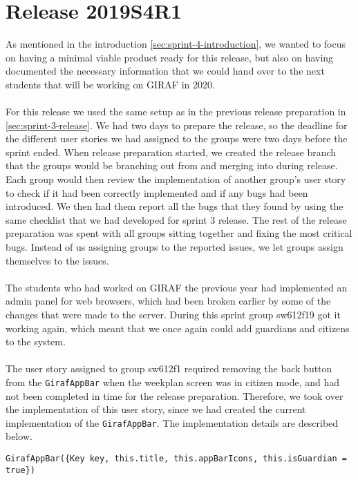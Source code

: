 \section{Release 2019S4R1}
As mentioned in the introduction \autoref{sec:sprint-4-introduction}, we wanted to focus on having a minimal viable product ready for this release, but also on having documented the necessary information that we could hand over to the next students that will be working on GIRAF in 2020.
\\\\
For this release we used the same setup as in the previous release preparation in \autoref{sec:sprint-3-release}. 
We had two days to prepare the release, so the deadline for the different user stories we had assigned to the groups were two days before the sprint ended.
When release preparation started, we created the release branch that the groups would be branching out from and merging into during release.
Each group would then review the implementation of another group's user story to check if it had been correctly implemented and if any bugs had been introduced.
We then had them report all the bugs that they found by using the same checklist that we had developed for sprint 3 release.
The rest of the release preparation was spent with all groups sitting together and fixing the most critical bugs.
Instead of us assigning groups to the reported issues, we let groups assign themselves to the issues.
\\\\
The students who had worked on GIRAF the previous year had implemented an admin panel for web browsers, which had been broken earlier by some of the changes that were made to the server.
During this sprint group sw612f19 got it working again, which meant that we once again could add guardians and citizens to the system.
\\\\
The user story assigned to group sw612f1 required removing the back button from the \texttt{GirafAppBar} when the weekplan screen was in citizen mode, and had not been completed in time for the release preparation.
Therefore, we took over the implementation of this user story, since we had created the current implementation of the \texttt{GirafAppBar}.
The implementation details are described below.
\begin{lstlisting}[caption={Removing back button from the citizens screen},label={lst:removeBackButton},language={[Sharp]C}]
    GirafAppBar({Key key, this.title, this.appBarIcons, this.isGuardian = true})
\end{lstlisting}
